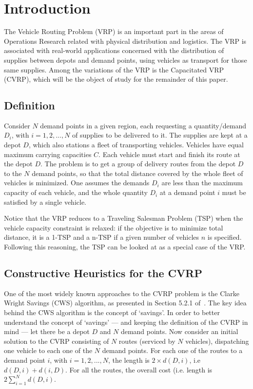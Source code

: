 \section{Introduction}
\label{sec:intro}

The Vehicle Routing Problem (VRP) is an important part in the areas of 
Operations Research related with physical distribution and logistics. The VRP is 
associated with real-world applications concerned with the distribution of 
supplies between depots and demand points, using vehicles as transport for 
those same supplies. Among the variations of the VRP is 
the Capacitated VRP (CVRP), which will be the object of study for the remainder 
of this paper.

\subsection{Definition}
\label{subsec:definition}

Consider $N$ demand points in a given region, each requesting a 
quantity\slash demand $D_i$, with $i = 1, 2, ..., N$ of supplies to be 
delivered to it. The supplies are kept at a depot $D$, which also stations a 
fleet of transporting vehicles. Vehicles have equal maximum carrying capacities 
$C$. Each vehicle must start and finish its route at the depot $D$. The 
problem is to get a group of delivery routes from the depot $D$ to the $N$ 
demand points, so that the total distance covered by the whole fleet of 
vehicles is minimized. One assumes the demands $D_i$ are less than the maximum 
capacity of each vehicle, and the whole quantity $D_i$ at a demand point $i$ 
must be satisfied by a single vehicle.\vertbreak

Notice that the VRP reduces to a Traveling Salesman Problem (TSP) when the 
vehicle capacity constraint is relaxed: if the objective is to minimize 
total distance, it is a 1-TSP and a n-TSP if a given number of vehicles $n$ is 
specified. Following this reasoning, the TSP can be looked at as a special case 
of the VRP.

\subsection{Constructive Heuristics for the CVRP}
\label{subsec:constructive}

One of the most widely known approaches to the CVRP problem is the Clarke Wright 
Savings (CWS) algorithm, as presented in Section 5.2.1 of~\cite{Toth2002}. The 
key idea behind the CWS algorithm is the concept of `savings'. In order to 
better understand the concept of `savings' --- and keeping the definition of the 
CVRP in mind --- let there be a depot $D$ and $N$ demand points. Now consider an 
initial solution to the CVRP consisting of $N$ routes (serviced by $N$ vehicles), 
dispatching one vehicle to each one of the $N$ demand points. For each one of 
the routes to a demand point $i$, with $i = 1, 2, ..., N$, the length is 
$2 \times d(D,i)$, i.e $d(D,i) + d(i,D)$. For all the routes, the overall cost (i.e. 
length is $2\sum_{i=1}^{N} d(D,i)$.\vertbreak

